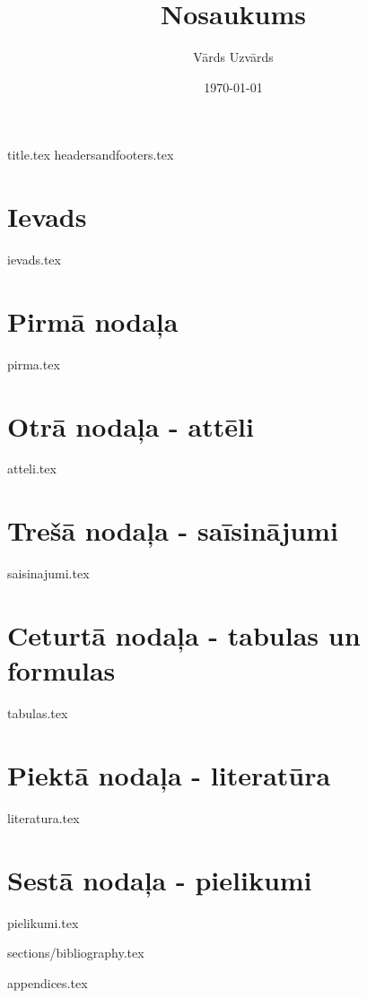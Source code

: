 \documentclass[a4paper,12pt]{article}
\author{Vārds Uzvārds}
\title{Nosaukums}
\date{\today}
\begin{document}
{title.tex}                  %
{headersandfooters.tex}      %
\printglossaries	                    %
\setcounter{page}{2} 
\pagebreak
\tableofcontents
\thispagestyle{fancy}                   %
\section*{Ievads}
{ievads.tex}

\section{Pirmā nodaļa}
{pirma.tex}

\section{Otrā nodaļa - attēli}
{atteli.tex}

\section{Trešā nodaļa - saīsinājumi}
{saisinajumi.tex}

\section{Ceturtā nodaļa - tabulas un formulas}
{tabulas.tex}

\section{Piektā nodaļa - literatūra}
{literatura.tex}

\section{Sestā nodaļa - pielikumi}
{pielikumi.tex}

{sections/bibliography.tex}

{appendices.tex}
\end{document}
